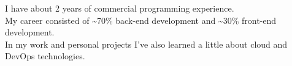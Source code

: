 
\par{
I have about 2 years of commercial programming experience. \\
My career consisted of \textasciitilde70\% back-end development and \textasciitilde30\% front-end development. \\
In my work and personal projects I've also learned a little about cloud and DevOps technologies.
}